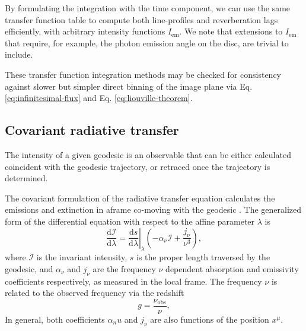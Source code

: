 \documentclass[fleqn,usenatbib]{mnras}
\renewcommand{\d}{\text{d}}
\begin{document}
By formulating the integration with the time component, we can use the same transfer function table to compute both line-profiles and reverberation lags efficiently, with arbitrary intensity functions $I_\text{em}$. We note that extensions to $I_\text{em}$ that require, for example, the photon emission angle on the disc, are trivial to include.

These transfer function integration methods may be checked for consistency against slower but simpler direct binning of the image plane via Eq. \eqref{eq:infinitesimal-flux} and Eq. \eqref{eq:liouville-theorem}.

\subsection{Covariant radiative transfer}

The intensity of a given geodesic is an observable that can be either calculated coincident with the geodesic trajectory, or retraced once the trajectory is determined.

The covariant formulation of the radiative transfer equation calculates the emissions and extinction in aframe co-moving with the geodesic \citep{fuerst_radiation_2004,younsi_general_2012}. The generalized form of the differential equation with respect to the affine parameter $\lambda$ is
\begin{equation}
    \label{eq:covariant-radiative-transfer}
    \frac{\d \mathcal{I}}{\d \lambda} = \left. \frac{\d s}{\d \lambda} \right\rvert_\lambda \left( -\alpha_\nu \mathcal{I} + \frac{j_\nu}{\nu^3} \right),
\end{equation}
where $\mathcal{I}$ is the invariant intensity, $s$ is the proper length traversed by the geodesic, and $\alpha_\nu$ and $j_\nu$ are the frequency $\nu$ dependent absorption and emissivity coefficients respectively, as measured in the local frame. The frequency $\nu$ is related to the observed frequency via the redshift
\begin{equation}
    g = \frac{\nu_\text{obs}}{\nu},
\end{equation}
In general, both coefficients $\alpha_nu$ and $j_\nu$ are also functions of the position $x^\mu$.
\end{document}
